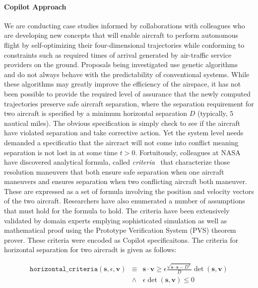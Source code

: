 \paragraph{Copilot Approach} We are conducting case studies informed
by collaborations with colleagues who  are developing 
 new concepts that will enable aircraft to
perform autonomous flight by self-optimizing their four-dimensional
trajectories while conforming to constraints such as required times of
arrival generated by air-traffic service providers on the
ground. Proposals being investigated use genetic
algorithms~\cite{KarrVRC} and do not always behave with the
predictability of conventional systems. While these algorithms may
greatly improve the efficiency of the airspace, it has not been
possible to provide the required level of assurance that 
the newly computed trajectories preserve safe aircraft separation,
where the separation requirement for two
aircraft is specified by a minimum horizontal separation $D$
(typically, $5$ nautical miles).  The obvious specification is
simply check to see if the aircraft have violated separation and take
corrective action.  Yet the system level needs demanded a specificatio
that the aircract will not come into conflict meaning separation is
not lost in at some time $t>0.$  Fortuitously,
colleagues at NASA have discovered analytical formula, called
\emph{criteria}~\cite{NM2011NASA,NMH14ATIO} that characterize those resolution maneuvers that both
ensure safe separation when one aircraft maneuvers and ensures
separation when two conflicting aircraft both
maneuver. These are expressed as a set of formula
involving the position and velocity vectors of the two
aircraft. Researchers have also enumerated a number of assumptions
that must hold for the formula to hold. The criteria have been
extensively validated  by domain experts emplying  sophisticated simulation as well as mathematical proof
using the Prototype Verification System (PVS) theorem prover. These
criteria were encoded as Copilot specificaitons. The criteria for
horizontal separation  for two aircradt  is given as follows:

\begin{eqnarray*} \texttt{horizontal\_criteria}(\bm{s}, \epsilon, \bm{v})
& \equiv &  \bm{s} \cdot \bm{v} \geq \epsilon  \frac{\sqrt{\bm{s} \cdot
  \bm{s}  - D^2}} {D} \operatorname{det}(\bm{s},\bm{v})  \\
& \wedge &  \epsilon \operatorname{det}(\bm{s},\bm{v})  \leq  0 
\end{eqnarray*}


